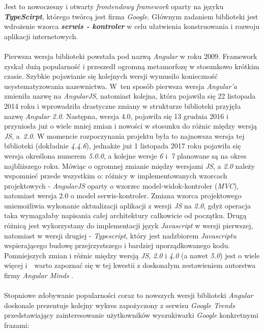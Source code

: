 \quad Jest to nowoczesny i otwarty \textit{frontendowy framework} oparty na języku \textbf{\textit{TypeScirpt}}, którego twórcą jest firma \textit{Google}. Głównym zadaniem biblioteki jest wdrożenie wzorca \textit{\textbf{serwis - kontroler}} w celu ułatwienia konstruowania i rozwoju aplikacji internetowych. \\
\\
Pierwsza wersja biblioteki powstała pod nazwą \textit{Angular} w roku 2009. Framework zyskał dużą popularność i przeszedł ogromną metamorfozę w stosunkowo krótkim czasie. Szybkie pojawianie się kolejnych wersji wymusiło konieczność usystematyzowania nazewnictwa. W~ten sposób pierwsza wersja \textit{Angular'a} zmieniła nazwę na \textit{AngularJS}, natomiast kolejna, która pojawiła się 22 listopada 2014 roku i wprowadziła drastyczne zmiany w strukturze biblioteki przyjęła nazwę \textit{Angular 2.0}. Następna, wersja 4.0, pojawiła się 13 grudnia 2016 i przyniosła już o wiele mniej zmian i nowości w stosunku do różnic między wersją \textit{JS}, a~\textit{2.0}. W momencie rozpoczynania projektu była to najnowsza wersja tej biblioteki (dokładnie \textit{4.4.6}), jednakże już 1 listopada 2017 roku pojawiła się wersja określona numerem \textit{5.0.0}, a kolejne wersje \textit{6} i~\textit{7} planowane są na okres najbliższego roku. Mówiąc o ogromnej zmianie między wersjami \textit{JS}, a \textit{2.0} należy wspomnieć przede wszystkim o: różnicy w implementowanych wzorcach projektowych - \textit{AngularJS} oparty o wzorzec model-widok-kontroler (\textit{MVC}), natomiast wersja 2.0 o model serwis-kontroler. Zmiana wzorca projektowego uniemożliwia wykonanie aktualizacji aplikacji z wersji \textit{JS} na \textit{2.0}, gdyż operacja taka wymagałaby napisania całej architektury całkowicie od początku. Drugą różnicą jest wykorzystany do implementacji język \textit{Javascript} w wersji pierwszej, natomiast w wersji drugiej - \textit{Typescript}, który jest nadzbiorem \textit{Javascriptu} wspierającego budowę przejrzystszego i bardziej uporządkowanego kodu. Pomniejszych zmian i różnic między wersją \textit{JS}, \textit{2.0} i \textit{4.0} (a nawet \textit{5.0}) jest o wiele więcej i~~warto zapoznać się w tej kwestii z doskonałym zestawieniem autorstwa firmy \textit{Angular Minds} \cite{angular-comparison}.\\
\\
Stopniowe zdobywanie popularności coraz to nowszych wersji biblioteki \textit{Angular} doskonale prezentuje kolejny wykres zapożyczony z serwisu \textit{Google Trends} przedstawiający zainteresowanie użytkowników wyszukiwarki \textit{Google} konkretnymi frazami:
